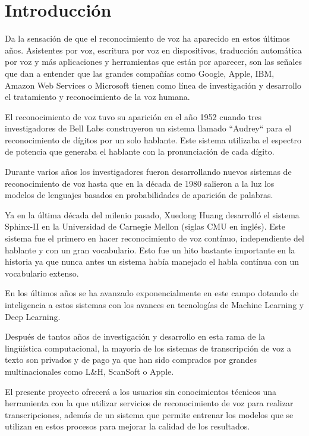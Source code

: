 \documentclass[../main.tex]{subfiles}
\begin{document}
\chapter{Introducción}\label{ch:introduccion}
Da la sensación de que el reconocimiento de voz ha aparecido en estos últimos años. Asistentes por voz, escritura por voz en dispositivos, traducción automática por voz y más aplicaciones y herramientas que están por aparecer, son las señales que dan a entender que las grandes compañías como Google, Apple, IBM, Amazon Web Services o Microsoft tienen como línea de investigación y desarrollo el tratamiento y reconocimiento de la voz humana.

El reconocimiento de voz tuvo su aparición en el año 1952 cuando tres investigadores de Bell Labs construyeron un sistema llamado ``Audrey`` para el reconocimiento de dígitos por un solo hablante. Este sistema utilizaba el espectro de potencia que generaba el hablante con la pronunciación de cada dígito.

Durante varios años los investigadores fueron desarrollando nuevos sistemas de reconocimiento de voz hasta que en la década de 1980 salieron a la luz los modelos de lenguajes basados en probabilidades de aparición de palabras.

Ya en la última década del milenio pasado, Xuedong Huang desarrolló el sistema Sphinx-II en la Universidad de Carnegie Mellon (siglas CMU en inglés). Este sistema fue el primero en hacer reconocimiento de voz contínuo, independiente del hablante y con un gran vocabulario. Esto fue un hito bastante importante en la historia ya que nunca antes un sistema había manejado el habla contínua con un vocabulario extenso.

En los últimos años se ha avanzado exponencialmente en este campo dotando de inteligencia a estos sistemas con los avances en tecnologías de Machine Learning y Deep Learning. 

Después de tantos años de investigación y desarrollo en esta rama de la lingüística computacional, la mayoría de los sistemas de transcripción de voz a texto son privados y de pago ya que han sido comprados por grandes multinacionales como L\&H, ScanSoft o Apple.

El presente proyecto ofrecerá a los usuarios sin conocimientos técnicos una herramienta con la que utilizar servicios de reconocimiento de voz para realizar transcripciones, además de un sistema que permite entrenar los modelos que se utilizan en estos procesos para mejorar la calidad de los resultados. 
\end{document}
